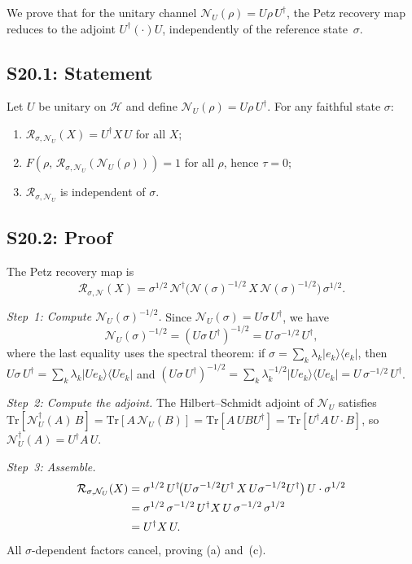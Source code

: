 \documentclass[prl,twocolumn,superscriptaddress,longbibliography]{revtex4-2}
\newcommand{\Tr}{\mathrm{Tr}}
\newcommand{\Petz}{\mathcal{R}}
\newcommand{\chan}{\mathcal{N}}
\newcommand{\hilb}{\mathcal{H}}
\newcommand{\ket}[1]{|#1\rangle}
\newcommand{\bra}[1]{\langle#1|}
\newcommand{\tauasym}{\tau}
\begin{document}
We prove that for the unitary channel
$\chan_U(\rho) = U\rho\, U^\dagger$, the Petz recovery map reduces
to the adjoint $U^\dagger(\cdot)U$, independently of the reference
state~$\sigma$.

\subsection{S20.1: Statement}

Let $U$ be unitary on $\hilb$ and define
$\chan_U(\rho) = U\rho\, U^\dagger$.  For any faithful state $\sigma$:
\begin{enumerate}
\item[(a)] $\Petz_{\sigma,\chan_U}(X) = U^\dagger X\, U$ for all $X$;
\item[(b)] $F(\rho,\,\Petz_{\sigma,\chan_U}(\chan_U(\rho))) = 1$ for
  all $\rho$, hence $\tauasym = 0$;
\item[(c)] $\Petz_{\sigma,\chan_U}$ is independent of $\sigma$.
\end{enumerate}

\subsection{S20.2: Proof}

The Petz recovery map is
\begin{equation}
\Petz_{\sigma,\chan}(X) = \sigma^{1/2}\,
\chan^\dagger\!\big(\chan(\sigma)^{-1/2}\, X\,
\chan(\sigma)^{-1/2}\big)\,\sigma^{1/2}.
\end{equation}

\emph{Step~1: Compute $\chan_U(\sigma)^{-1/2}$.}
Since $\chan_U(\sigma) = U\sigma\, U^\dagger$, we have
\begin{equation}
\chan_U(\sigma)^{-1/2} = (U\sigma\, U^\dagger)^{-1/2}
= U\,\sigma^{-1/2}\, U^\dagger,
\end{equation}
where the last equality uses the spectral theorem: if
$\sigma = \sum_k \lambda_k \ket{e_k}\!\bra{e_k}$, then
$U\sigma\, U^\dagger = \sum_k \lambda_k \ket{Ue_k}\!\bra{Ue_k}$
and $(U\sigma\, U^\dagger)^{-1/2}
= \sum_k \lambda_k^{-1/2}\ket{Ue_k}\!\bra{Ue_k}
= U\,\sigma^{-1/2}\, U^\dagger$.

\emph{Step~2: Compute the adjoint.}
The Hilbert--Schmidt adjoint of $\chan_U$ satisfies
$\Tr[\chan_U^\dagger(A)\, B] = \Tr[A\, \chan_U(B)]
= \Tr[A\, U B U^\dagger] = \Tr[U^\dagger A\, U \cdot B]$,
so $\chan_U^\dagger(A) = U^\dagger A\, U$.

\emph{Step~3: Assemble.}
\begin{align}
\Petz_{\sigma,\chan_U}(X)
&= \sigma^{1/2}\, U^\dagger\!\big(
  U\sigma^{-1/2}U^\dagger\, X\,
  U\sigma^{-1/2}U^\dagger
\big)\, U \cdot \sigma^{1/2} \notag\\
&= \sigma^{1/2}\,\sigma^{-1/2}\, U^\dagger X\, U\,
  \sigma^{-1/2}\,\sigma^{1/2} \notag\\
&= U^\dagger X\, U.
\end{align}
All $\sigma$-dependent factors cancel, proving (a) and~(c).
\end{document}
